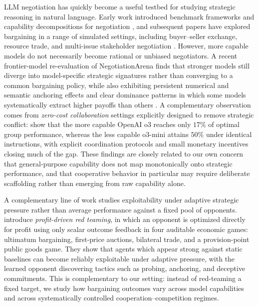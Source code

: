 LLM negotiation has quickly become a useful testbed for studying strategic reasoning in natural language.
Early work introduced benchmark frameworks and capability decompositions for negotiation \citep{bianchi_how_2024,kwon-etal-2024-llms}, and subsequent papers have explored bargaining in a range of simulated settings, including buyer--seller exchange, resource trade, and multi-issue stakeholder negotiation \citep{abdelnabi_cooperation_2024,davidson_evaluating_2024,chatterjee_agreemate_2024,noh_llms_2024}.
However, more capable models do not necessarily become rational or unbiased negotiators.
A recent frontier-model re-evaluation of NegotiationArena finds that stronger models still diverge into model-specific strategic signatures rather than converging to a common bargaining policy, while also exhibiting persistent numerical and semantic anchoring effects and clear dominance patterns in which some models systematically extract higher payoffs than others \citep{rios_illusion_2025}.
A complementary observation comes from \emph{zero-cost collaboration} settings explicitly designed to remove strategic conflict: \citet{yadav_more_2026} show that the more capable OpenAI o3 reaches only $17\%$ of optimal group performance, whereas the less capable o3-mini attains $50\%$ under identical instructions, with explicit coordination protocols and small monetary incentives closing much of the gap.
These findings are closely related to our own concern that general-purpose capability does not map monotonically onto strategic performance, and that cooperative behavior in particular may require deliberate scaffolding rather than emerging from raw capability alone.

A complementary line of work studies exploitability under adaptive strategic pressure rather than average performance against a fixed pool of opponents.
\citet{wang_profit_2026} introduce \emph{profit-driven red teaming}, in which an opponent is optimized directly for profit using only scalar outcome feedback in four auditable economic games: ultimatum bargaining, first-price auctions, bilateral trade, and a provision-point public goods game.
They show that agents which appear strong against static baselines can become reliably exploitable under adaptive pressure, with the learned opponent discovering tactics such as probing, anchoring, and deceptive commitments.
This is complementary to our setting: instead of red-teaming a fixed target, we study how bargaining outcomes vary across model capabilities and across systematically controlled cooperation--competition regimes.

